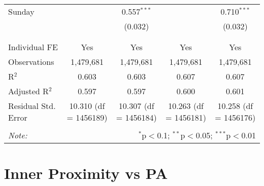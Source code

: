 \documentclass[
]{article}
\begin{document}
\begin{table}[!htbp]
{\begin{tabular}{@{\extracolsep{5pt}}lcccc}
 Sunday &  & 0.557$^{***}$ &  & 0.710$^{***}$ \\ 
  &  & (0.032) &  & (0.032) \\ 
  & & & & \\ 
\hline \\[-1.8ex] 
Individual FE & Yes & Yes & Yes & Yes \\ 
Observations & 1,479,681 & 1,479,681 & 1,479,681 & 1,479,681 \\ 
R$^{2}$ & 0.603 & 0.603 & 0.607 & 0.607 \\ 
Adjusted R$^{2}$ & 0.597 & 0.597 & 0.600 & 0.601 \\ 
Residual Std. Error & 10.310 (df = 1456189) & 10.307 (df = 1456184) & 10.263 (df = 1456181) & 10.258 (df = 1456176) \\ 
\hline 
\hline \\[-1.8ex] 
\textit{Note:}  & \multicolumn{4}{r}{$^{*}$p$<$0.1; $^{**}$p$<$0.05; $^{***}$p$<$0.01} \\ 
\end{tabular}
} 
\end{table} 
\newpage
\section{Inner Proximity vs PA}
\end{document}
